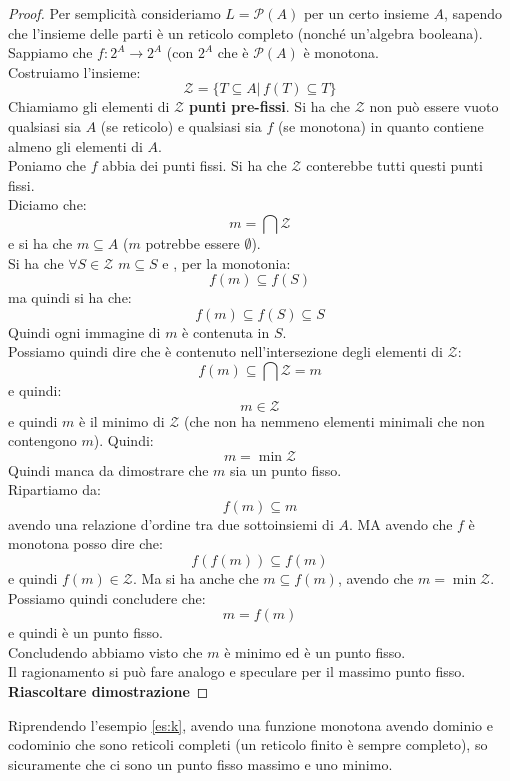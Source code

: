 \begin{proof}
  Per semplicità consideriamo $L=\mathcal{P}(A)$ per un certo insieme $A$,
  sapendo che l'insieme delle parti è un reticolo completo (nonché un'algebra
  booleana).\\
  Sappiamo che $f:2^A\to 2^A$ (con $2^A$ che è $\mathcal{P}(A)$ è monotona.\\
  Costruiamo l'insieme:
  \[\mathcal{Z}=\{T\subseteq A|\, f(T)\subseteq T\}\]
  Chiamiamo gli elementi di $\mathcal{Z}$ \textbf{punti pre-fissi}. Si ha che
  $\mathcal{Z}$ non può essere vuoto qualsiasi sia $A$ (se reticolo) e qualsiasi
  sia $f$ (se monotona) in quanto contiene almeno gli elementi di $A$.\\
  Poniamo che $f$ abbia dei punti fissi. Si ha che $\mathcal{Z}$ conterebbe
  tutti questi punti fissi. \\
  Diciamo che:
  \[m=\bigcap \mathcal{Z}\]
  e si ha che $m\subseteq A$ ($m$ potrebbe essere $\emptyset$).\\
  Si ha che $\forall S\in \mathcal{Z}$ $m\subseteq S$ e , per la monotonia: 
  \[f(m)\subseteq f(S)\]
  ma quindi si ha che:
  \[f(m)\subseteq f(S)\subseteq S\]
  Quindi ogni immagine di $m$ è contenuta in $S$.\\
  Possiamo quindi dire che è contenuto nell'intersezione degli elementi di
  $\mathcal{Z}$: 
  \[f(m)\subseteq\bigcap \mathcal{Z}=m\]
  e quindi:
  \[m\in \mathcal{Z}\]
  e quindi $m$ è il minimo di $\mathcal{Z}$ (che non ha nemmeno elementi
  minimali che non contengono $m$). Quindi:
  \[m=\min\mathcal{Z}\]
  Quindi manca da dimostrare che $m$ sia un punto fisso.\\
  Ripartiamo da:
  \[f(m)\subseteq m\]
  avendo una relazione d'ordine tra due sottoinsiemi di $A$. MA avendo che $f$ è
  monotona posso dire che:
  \[f(f(m))\subseteq f(m)\]
  e quindi $f(m)\in \mathcal{Z}$. Ma si ha anche che $m\subseteq f(m)$, avendo
  che $m=\min\mathcal{Z}$. Possiamo quindi concludere che:
  \[m=f(m)\]
  e quindi è un punto fisso.\\
  Concludendo abbiamo visto che $m$ è minimo ed è un punto fisso.\\
  Il ragionamento si può fare analogo e speculare per il massimo punto fisso.\\
  \textbf{Riascoltare dimostrazione}
\end{proof}
\begin{esempio}
  Riprendendo l'esempio \ref{es:k}, avendo una funzione monotona avendo dominio
  e codominio che sono reticoli completi (un reticolo finito è sempre completo),
  so sicuramente che ci sono un punto fisso massimo e uno minimo.
\end{esempio}

